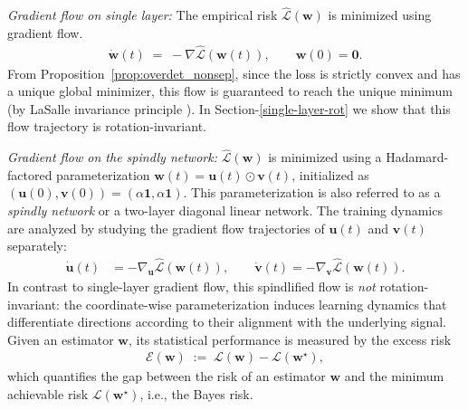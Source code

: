 \documentclass{article}
\theoremstyle{plain}
\theoremstyle{definition}
\theoremstyle{remark}
\begin{document}
\textit{Gradient flow on single layer:} The empirical risk $\widehat{\mathcal{L}}(\mathbf{w})$ is minimized using gradient flow.
\begin{align}
\label{emp-gf-flow} 
\dot{\mathbf{w}}(t)
\;=\;
- \nabla \widehat{\mathcal{L}}(\mathbf{w}(t)),
\qquad
\mathbf{w}(0)=\mathbf{0}.
\end{align}
From Proposition~\ref{prop:overdet_nonsep}, since the loss is strictly convex and has a unique global minimizer, this flow is guaranteed to reach the unique minimum (by LaSalle invariance principle \cite{khalil2002nonlinear}). In Section-\ref{single-layer-rot} we show that this flow trajectory is rotation-invariant. 


\textit{Gradient flow on the spindly network:}
 $\widehat{\mathcal{L}}(\mathbf{w})$ is minimized using a Hadamard-factored parameterization $\mathbf{w}(t)=\mathbf{u}(t)\odot\mathbf{v}(t)$, initialized as $(\mathbf{u}(0),\mathbf{v}(0))=(\alpha\mathbf{1},\alpha\mathbf{1})$. This parameterization is also referred to as a \textit{spindly network} or a two-layer diagonal linear network. The training dynamics are analyzed by studying the gradient flow trajectories of $\mathbf{u}(t)$ and $\mathbf{v}(t)$ separately:
\begin{align}
\dot{\mathbf{u}}(t)
&=
- \nabla_{\mathbf{u}}
\widehat{\mathcal{L}}(\mathbf{w}(t)),
\qquad
\dot{\mathbf{v}}(t)
=
- \nabla_{\mathbf{v}}
\widehat{\mathcal{L}}(\mathbf{w}(t)).
\end{align}
In contrast to single-layer gradient flow, this spindlified flow is \emph{not} rotation-invariant: the coordinate-wise parameterization induces learning dynamics that differentiate directions according to their alignment with the underlying signal. 
Given an estimator $\mathbf{w}$, its statistical performance is measured by the excess risk
\begin{align}
\label{excess-risk}
\mathcal{E}(\mathbf{w})
\;:=\;
\mathcal{L}(\mathbf{w})-\mathcal{L}(\mathbf{w}^{\star}),
\end{align}
which quantifies the gap between the risk of an estimator $\mathbf{w}$ and the minimum achievable risk $\mathcal{L}(\mathbf{w}^{\star})$, i.e., the Bayes risk.
















\end{document}
